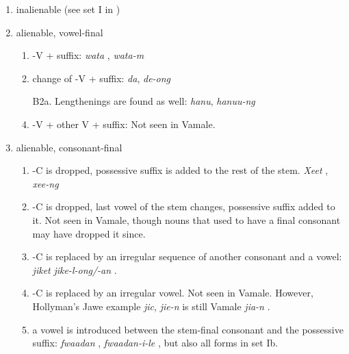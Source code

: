 \begin{enumerate}[label=\Alph*.]
	\item inalienable (see set I in )
	\item alienable, vowel-final
	\begin{enumerate}[label=B\arabic*.]
		\item -V + suffix: \textit{wata} , \textit{wata-m} 
		\item change of -V + suffix: \textit{da},  \textit{de-ong}  
		\item[B2a.] Lengthenings are found as well: \textit{hanu},  \textit{hanuu-ng} 
		\item -V + other V + suffix: Not seen in Vamale.
	\end{enumerate}
	\item alienable, consonant-final
	\begin{enumerate}[label=C\arabic*.]
		\item -C is dropped, possessive suffix is added to the rest of the stem. \textit{Xeet} , \textit{xee-ng} 
		\item -C is dropped, last vowel of the stem changes, possessive suffix added to it. Not seen in Vamale, though nouns that used to have a final consonant may have dropped it since.
		\item -C is replaced by an irregular sequence of another consonant and a vowel: \textit{jiket}  \textit{jike-l-ong/-an} . 
		\item -C is replaced by an irregular vowel. Not seen in Vamale. However, Hollyman's Jawe example \textit{jic}, \textit{jie-n}  is still Vamale \textit{jia-n} \parencite[62]{hollyman_etudes_1999}.
		\item a vowel is introduced between the stem-final consonant and the possessive suffix: \textit{fwaadan} , \textit{fwaadan-i-le} , but also all forms in set Ib.
	\end{enumerate}
\end{enumerate}


